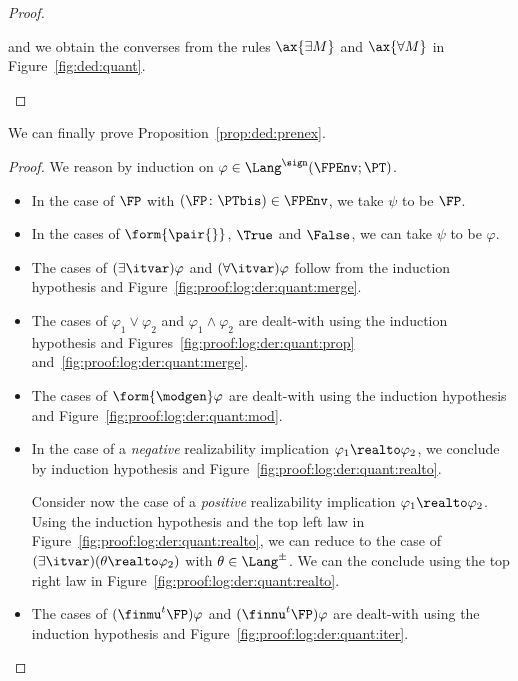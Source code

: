 \begin{proof}
\begin{description}
\noindent
and we obtain the converses from the rules
$\ax{\exists M}$ and $\ax{\forall M}$
in Figure~\ref{fig:ded:quant}.
\qedhere
\end{description}
\end{proof}

We can finally prove Proposition~\ref{prop:ded:prenex}.

\PropFormPrenex*

\begin{proof}
We reason by induction on $\varphi \in \Lang^\sign(\FPEnv; \PT)$.
\begin{itemize}
\item
In the case of $\FP$ with $(\FP \colon \PTbis) \in \FPEnv$,
we take $\psi$ to be $\FP$.

\item
In the cases of $\form{\pair{}}$, $\True$ and $\False$,
we can take $\psi$ to be $\varphi$.

\item
The cases of $(\exists \itvar)\varphi$ and $(\forall \itvar)\varphi$ 
follow from the induction hypothesis
and Figure~\ref{fig:proof:log:der:quant:merge}.

\item
The cases of $\varphi_1 \lor \varphi_2$ and $\varphi_1 \land \varphi_2$
are dealt-with using the induction hypothesis and
Figures~\ref{fig:proof:log:der:quant:prop}
and~\ref{fig:proof:log:der:quant:merge}.

\item
The cases of $\form{\modgen}\varphi$ are dealt-with 
using the induction hypothesis and
Figure~\ref{fig:proof:log:der:quant:mod}.

\item
In the case of a \emph{negative} realizability implication
$\varphi_1 \realto \varphi_2$,
we conclude by induction hypothesis
and Figure~\ref{fig:proof:log:der:quant:realto}.

Consider now the case of a \emph{positive} realizability implication
$\varphi_1 \realto \varphi_2$.
Using the induction hypothesis
and the top left law in Figure~\ref{fig:proof:log:der:quant:realto},
we can reduce
to the case of
$(\exists \itvar)(\theta \realto \varphi_2)$
with $\theta \in \Lang^\pm$.
We can the conclude using the top right law
in Figure~\ref{fig:proof:log:der:quant:realto}.

\item
The cases of $(\finmu^t \FP)\varphi$ and $(\finnu^t \FP)\varphi$
are dealt-with using the induction hypothesis and
Figure~\ref{fig:proof:log:der:quant:iter}.
\qedhere
\end{itemize}
\end{proof}
